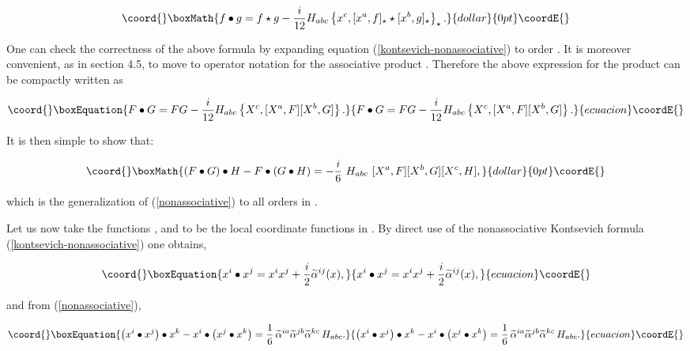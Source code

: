 \documentclass[a4paper,11pt]{article}
\providecommand{\mathbb}[1]{{\bf{#1}}}
\begin{document}
$$\coord{}\boxMath{
f\bullet g = f\star g - \frac{i}{12} H_{abc} \left\{ x^{c}, [ x^{a},f
]_{\star} \star [ x^{b},g ]_{\star} \right\}_{\star}  .
}{dollar}{0pt}\coordE{}$$

\noindent
One can check the correctness of the above formula by expanding equation
(\ref{kontsevich-nonassociative}) to order \coordHE{}. It is moreover
convenient, as in section 4.5, to move to operator notation for the
associative product \myHighlight{$\star$}\coordHE{}. Therefore the above expression for the product
\myHighlight{$\bullet$}\coordHE{} can be compactly written as

\begin{equation}\coord{}\boxEquation{ \label{FbulletG}
F\bullet G = FG - \frac{i}{12} H_{abc} \left\{ X^{c}, [ X^{a},F ] [ X^{b},G
] \right\} .
}{ F\bullet G = FG - \frac{i}{12} H_{abc} \left\{ X^{c}, [ X^{a},F ] [ X^{b},G
] \right\} .
}{ecuacion}\coordE{}\end{equation}

\noindent
It is then simple to show that:

$$\coord{}\boxMath{
\left( F\bullet G\right) \bullet H - F\bullet \left( G\bullet H\right) = - 
\frac{i}{6}\ H_{abc}\ [ X^{a},F ] [ X^{b},G ] [ X^{c},H ] ,
}{dollar}{0pt}\coordE{}$$

\noindent
which is the generalization of (\ref{nonassociative}) to all orders in
\myHighlight{$\alpha$}\coordHE{}.

Let us now take the functions \coordHE{}, \coordHE{} and \coordHE{} to be the local coordinate
functions \coordHE{} in \myHighlight{$\mathbb{R}^{n}$}\coordHE{}. By direct use of the nonassociative
Kontsevich formula (\ref{kontsevich-nonassociative}) one obtains,

\begin{equation}\coord{}\boxEquation{  \label{product-coordinates}
x^{i} \bullet x^{j} = x^{i} x^{j} + {\frac{i}{2}} \widetilde{\alpha}^{ij}(x),
}{  x^{i} \bullet x^{j} = x^{i} x^{j} + {\frac{i}{2}} \widetilde{\alpha}^{ij}(x),
}{ecuacion}\coordE{}\end{equation}

\noindent 
and from (\ref{nonassociative}),

\begin{equation}\coord{}\boxEquation{  \label{nonassociative-coordinates}
\left( x^{i} \bullet x^{j} \right) \bullet x^{k} - x^{i} \bullet \left(
x^{j} \bullet x^{k} \right) = \frac{1}{6}\, \widetilde{\alpha}^{ia} 
\widetilde{\alpha}^{jb} \widetilde{\alpha}^{kc}\, H_{abc} .
}{  \left( x^{i} \bullet x^{j} \right) \bullet x^{k} - x^{i} \bullet \left(
x^{j} \bullet x^{k} \right) = \frac{1}{6}\, \widetilde{\alpha}^{ia} 
\widetilde{\alpha}^{jb} \widetilde{\alpha}^{kc}\, H_{abc} .
}{ecuacion}\coordE{}\end{equation}
\end{document}
